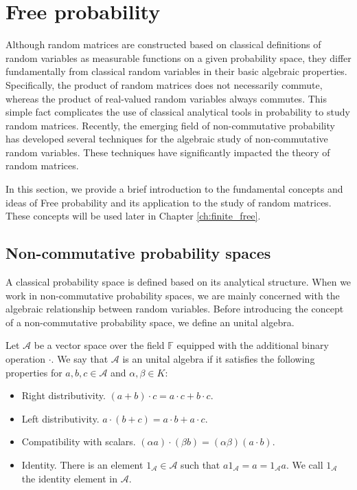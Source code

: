 \section{Free probability}

Although random matrices are constructed based on classical definitions of random variables as measurable functions on a given probability space, they differ fundamentally from classical random variables in their basic algebraic properties. Specifically, the product of random matrices does not necessarily commute, whereas the product of real-valued random variables always commutes. This simple fact complicates the use of classical analytical tools in probability to study random matrices. Recently, the emerging field of non-commutative probability has developed several techniques for the algebraic study of non-commutative random variables. These techniques have significantly impacted the theory of random matrices.

In this section, we provide a brief introduction to the fundamental concepts and ideas of Free probability and its application to the study of random matrices. These concepts will be used later in Chapter \ref{ch:finite_free}.


\subsection{Non-commutative probability spaces}

A classical probability space is defined based on its analytical structure. When we work in non-commutative probability spaces, we are mainly concerned with the algebraic relationship between random variables. Before introducing the concept of a non-commutative probability space, we define an unital algebra.

\begin{definition}
    Let $\mathcal A$ be a vector space over the field $\mathbb F$ equipped with the additional binary operation $\cdot$. We say that $\mathcal A$ is an unital algebra if it satisfies the following properties for $a,b,c \in \mathcal A$ and $\alpha, \beta \in K$:

    \begin{itemize}
        \item Right distributivity. $(a + b) \cdot c = a\cdot c + b \cdot c$.
        \item Left distributivity. $a\cdot(b + c) = a\cdot b + a \cdot c$.
        \item Compatibility with scalars. $(\alpha a)\cdot(\beta b) = (\alpha \beta)(a\cdot b)$.
        \item Identity. There is an element $1_{\mathcal A}\in \mathcal A$ such that $a 1_{\mathcal A} = a = 1_{\mathcal A} a$. We call $1_{\mathcal A}$ the identity element in $\mathcal A$.
    \end{itemize}

\end{definition}

